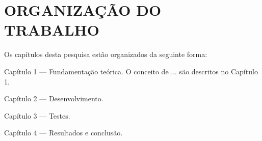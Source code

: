 \section{ORGANIZAÇÃO DO TRABALHO}
\label{sec:organizacaoTrabalho}

Os capítulos desta pesquisa estão organizados da seguinte forma: 

\begin{description}
	\setlength\itemindent{15pt}
	\item[•] Capítulo 1 — Fundamentação teórica. O conceito de ... são descritos no Capítulo 1. 
	
	\item[•] Capítulo 2 — Desenvolvimento. 
	
	\item[•] Capítulo 3 — Testes. 
	
	\item[•] Capítulo 4 — Resultados e conclusão.  
	
\end{description}  


